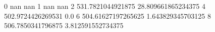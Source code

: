 0 nan nan
1 nan nan
2 531.7821044921875 28.809661865234375
4 502.9724426269531 0.0
6 504.61627197265625 1.643829345703125
8 506.7850341796875 3.812591552734375
